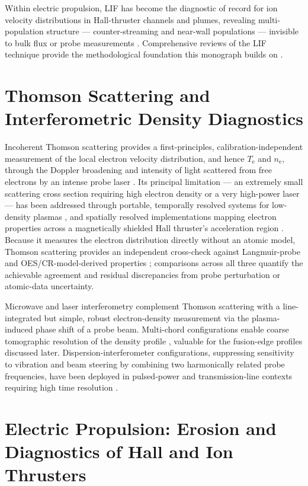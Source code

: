 Within electric propulsion, LIF has become the diagnostic of record for ion velocity distributions in Hall-thruster channels and plumes, revealing multi-population structure — counter-streaming and near-wall populations — invisible to bulk flux or probe measurements \cite{ref0322}. Comprehensive reviews of the LIF technique provide the methodological foundation this monograph builds on \cite{ref0347}.

\section{Thomson Scattering and Interferometric Density Diagnostics}

Incoherent Thomson scattering provides a first-principles, calibration-independent measurement of the local electron velocity distribution, and hence $T_{\mathrm{e}}$ and $n_{\mathrm{e}}$, through the Doppler broadening and intensity of light scattered from free electrons by an intense probe laser \cite{ref0354}. Its principal limitation — an extremely small scattering cross section requiring high electron density or a very high-power laser — has been addressed through portable, temporally resolved systems for low-density plasmas \cite{ref0357}, and spatially resolved implementations mapping electron properties across a magnetically shielded Hall thruster's acceleration region \cite{ref0356}. Because it measures the electron distribution directly without an atomic model, Thomson scattering provides an independent cross-check against Langmuir-probe and OES/CR-model-derived properties \cite{ref0355}; comparisons across all three quantify the achievable agreement and residual discrepancies from probe perturbation or atomic-data uncertainty.

Microwave and laser interferometry complement Thomson scattering with a line-integrated but simple, robust electron-density measurement via the plasma-induced phase shift of a probe beam. Multi-chord configurations enable coarse tomographic resolution of the density profile \cite{ref0399}, valuable for the fusion-edge profiles discussed later. Dispersion-interferometer configurations, suppressing sensitivity to vibration and beam steering by combining two harmonically related probe frequencies, have been deployed in pulsed-power and transmission-line contexts requiring high time resolution \cite{ref0417}.

\section{Electric Propulsion: Erosion and Diagnostics of Hall and Ion Thrusters}

